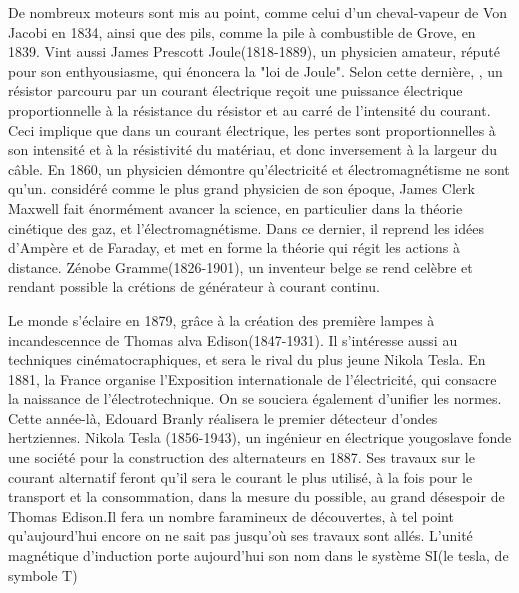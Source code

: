 \documentclass[12pt]{report}
\begin{document}
  De nombreux moteurs sont mis au point, comme celui d'un cheval-vapeur de Von Jacobi en 1834, ainsi que des pils, comme la pile à combustible de Grove, en 1839.
Vint aussi James Prescott Joule(1818-1889), un physicien amateur, réputé pour son enthyousiasme, qui énoncera la "loi de Joule". Selon cette dernière, , un résistor parcouru par un courant électrique reçoit une puissance électrique proportionnelle à la résistance du résistor et au carré de l'intensité du courant. Ceci implique que dans un courant électrique, les pertes sont proportionnelles à son intensité et à la résistivité du matériau, et donc inversement à la largeur du câble.
En 1860, un physicien démontre qu'électricité et électromagnétisme ne sont qu'un. considéré comme le plus grand physicien de son époque, James Clerk Maxwell fait énormément avancer la science, en particulier dans la théorie cinétique des gaz, et l'électromagnétisme. Dans ce dernier, il reprend les idées d'Ampère et de Faraday, et met en forme la théorie qui régit les actions à distance.
Zénobe Gramme(1826-1901), un inventeur belge se rend celèbre et rendant possible la crétions de générateur à courant continu.

Le monde s'éclaire en 1879, grâce à la création des première lampes à incandescennce de Thomas alva Edison(1847-1931). Il s'intéresse aussi au techniques cinématocraphiques, et sera le rival du plus jeune Nikola Tesla.
En 1881, la France organise l'Exposition internationale de l'électricité, qui consacre la naissance de l'électrotechnique. On se souciera également d'unifier les normes. Cette année-là, Edouard Branly réalisera le premier détecteur d'ondes hertziennes.
Nikola Tesla (1856-1943), un ingénieur en électrique yougoslave fonde une société pour la construction des alternateurs en 1887. Ses travaux sur le courant alternatif feront qu'il sera le courant le plus utilisé, à la fois pour le transport et la consommation, dans la mesure du possible, au grand désespoir de Thomas Edison.Il fera un nombre faramineux de découvertes, à tel point qu'aujourd'hui encore on ne sait pas jusqu'où ses travaux sont allés. L'unité magnétique d'induction porte aujourd'hui son nom dans le système SI(le tesla, de symbole T)
\end{document}
